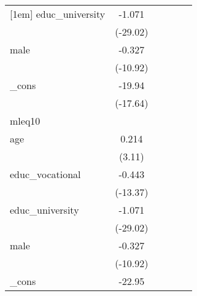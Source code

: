 {\begin{tabular}{l*{5}{c}}
[1em]
educ\_university&      -1.071\sym{***}&                     &                     &                     &                     \\
            &    (-29.02)         &                     &                     &                     &                     \\
[1em]
male        &      -0.327\sym{***}&                     &                     &                     &                     \\
            &    (-10.92)         &                     &                     &                     &                     \\
[1em]
\_cons      &      -19.94\sym{***}&                     &                     &                     &                     \\
            &    (-17.64)         &                     &                     &                     &                     \\
\hline
mleq10      &                     &                     &                     &                     &                     \\
age         &       0.214\sym{**} &                     &                     &                     &                     \\
            &      (3.11)         &                     &                     &                     &                     \\
[1em]
educ\_vocational&      -0.443\sym{***}&                     &                     &                     &                     \\
            &    (-13.37)         &                     &                     &                     &                     \\
[1em]
educ\_university&      -1.071\sym{***}&                     &                     &                     &                     \\
            &    (-29.02)         &                     &                     &                     &                     \\
[1em]
male        &      -0.327\sym{***}&                     &                     &                     &                     \\
            &    (-10.92)         &                     &                     &                     &                     \\
[1em]
\_cons      &      -22.95\sym{***}&                     &                     &                     &                     \\

\end{tabular}}
